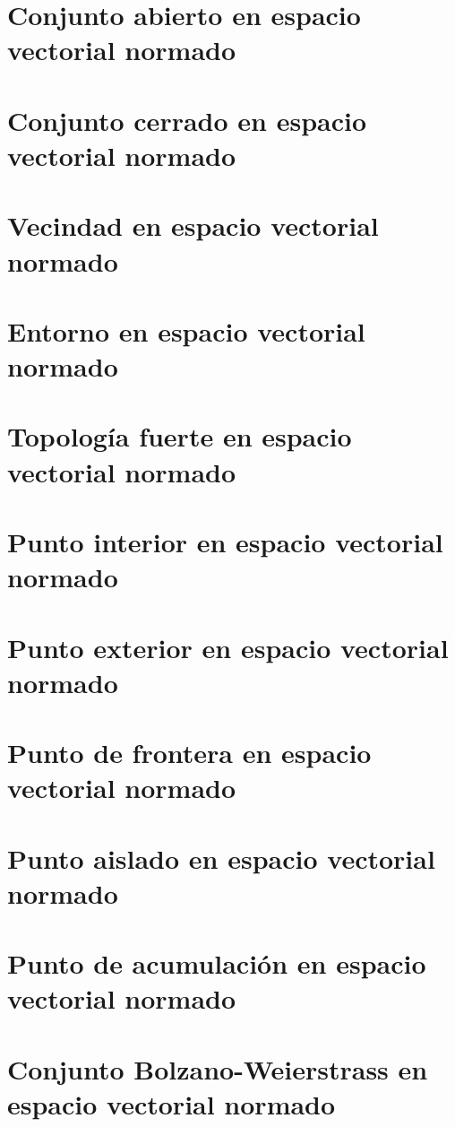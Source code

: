 \section{Conjunto abierto en espacio vectorial normado}

\section{Conjunto cerrado en espacio vectorial normado}

\section{Vecindad en espacio vectorial normado}

\section{Entorno en espacio vectorial normado}

\section{Topología fuerte en espacio vectorial normado}

\section{Punto interior en espacio vectorial normado}

\section{Punto exterior en espacio vectorial normado}

\section{Punto de frontera en espacio vectorial normado}

\section{Punto aislado en espacio vectorial normado}

\section{Punto de acumulación en espacio vectorial normado}

\section{Conjunto Bolzano-Weierstrass en espacio vectorial normado}

